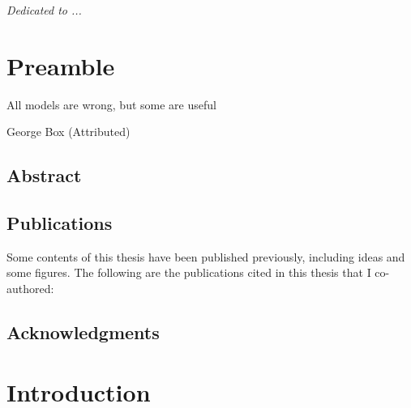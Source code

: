 \documentclass[
		twoside,openright,titlepage,numbers=noenddot,headinclude,%
	 	footinclude=true,cleardoublepage=empty,
		dottedtoc, %
		BCOR=5mm,paper=a4,fontsize=10pt, %
		ngerman,american, %
		]{scrreprt}
\begin{document}

\frenchspacing %
\raggedbottom %
\pagestyle{plain} %


\cleardoublepage
\vspace*{8cm}
\thispagestyle{empty}
\begin{center}
  \Large \emph{Dedicated to ...}
\end{center}
\cleardoublepage
\chapter*{Preamble}
\label{sec:preamble}
\epigraph{All models are wrong, but some are useful}{George Box (Attributed)}
\section*{Abstract}
\label{sec:abstract}

\cleardoublepage
\section*{Publications}
\label{sec:publications}
Some contents of this thesis have been published previously, including ideas and some figures. The following are the publications cited in this thesis that I co-authored: \\ \vspace{1cm}
\printbibliography[heading=none,keyword={contribution}]
\cleardoublepage
\section*{Acknowledgments}
\label{sec:acks}

\cleardoublepage
{} 
\chapter{Introduction}

\end{document}
